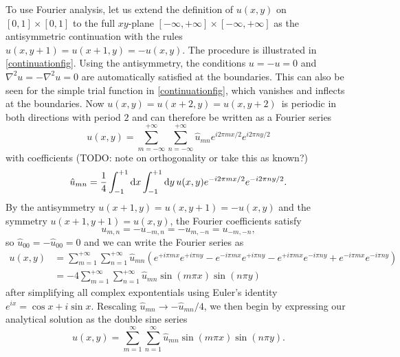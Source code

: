 To use Fourier analysis, let us extend the definition of $u(x,y)$ on $[0,1]\times[0,1]$ to the full $xy$-plane $[-\infty,+\infty]\times[-\infty,+\infty]$ as the antisymmetric continuation with the rules $u(x,y+1) = u(x+1,y) = -u(x,y)$.
The procedure is illustrated in \cref{continuationfig}.
Using the antisymmetry, the conditions $u = -u = 0$ and $\nabla^2 u = -\nabla^2 u = 0$ are automatically satisfied at the boundaries.
This can also be seen for the simple trial function in \cref{continuationfig}, which vanishes and inflects at the boundaries.
Now $u(x,y) = u(x+2,y) = u(x,y+2)$ is periodic in both directions with period $2$ and can therefore be written as a Fourier series
\begin{equation*}
	u(x,y) = \sum_{m=-\infty}^{+\infty} \sum_{n=-\infty}^{+\infty} \hat{u}_{mn} e^{i 2 \pi m x / 2} e^{i 2 \pi n y / 2}
\end{equation*}
with coefficients (TODO: note on orthogonality or take this as known?)
\begin{equation*}
	\hat{u}_{mn} = \frac{1}{4} \integraltwo{u(x,y) e^{-i 2 \pi m x / 2} e^{-i 2 \pi n y / 2}}{x}{y}{-1}{+1}{-1}{+1}.
\end{equation*}
By the antisymmetry $u(x+1,y)=u(x,y+1)=-u(x,y)$ and the symmetry $u(x+1,y+1)=u(x,y)$, the Fourier coefficients satisfy
\begin{equation*}
	u_{m,n} = -u_{-m,n} = -u_{m,-n} = u_{-m,-n},
\end{equation*}
so $\hat{u}_{00} = -\hat{u}_{00} = 0$ and we can write the Fourier series as
\begin{equation*}
\begin{split}
	u(x,y) &= \sum_{m=1}^{+\infty} \sum_{n=1}^{+\infty} \hat{u}_{mn}
	\left( 
	  e^{+i \pi m x} e^{+i \pi n y}
	- e^{-i \pi m x} e^{+i \pi n y}
	- e^{+i \pi m x} e^{-i \pi n y}
	+ e^{-i \pi m x} e^{-i \pi n y}
	\right) \\
	       &= -4 \sum_{m=1}^{+\infty} \sum_{n=1}^{+\infty} \hat{u}_{mn} \sin(m \pi x) \sin(n \pi y)
\end{split}
\end{equation*}
after simplifying all complex expontentials using Euler's identity $e^{ix} = \cos x + i \sin x$.
Rescaling $\hat{u}_{mn} \rightarrow -\hat{u}_{mn}/4$, we then begin by expressing our analytical solution as the double sine series
\newcommand{\fourierseries}[3]{
	\sum_{#2=1}^{\infty} \sum_{#3=1}^{\infty} #1 \sin(#2 \pi x) \sin(#3 \pi y)
}
\newcommand{\fourierexpand}[1]{
	\fourierseries{\hat{#1}_{mn}}{m}{n}
}
\begin{equation}
u(x,y) = \fourierexpand{u}.
\label{pde:equation:fourierexpansion}
\end{equation}

